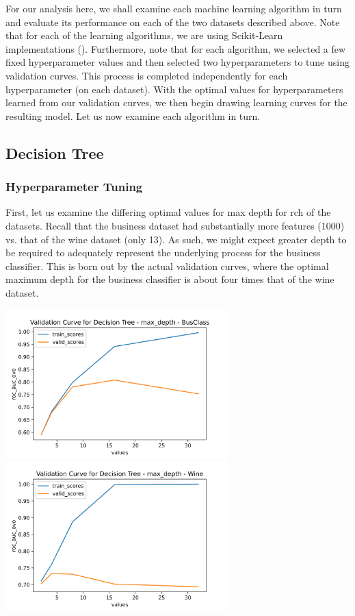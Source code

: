 \documentclass[
	letterpaper, %
]{jdf}
\begin{document}
For our analysis here, we shall examine each machine learning algorithm in turn and evaluate its performance on each of the two datasets described above. Note that for each of the learning algorithms, we are using Scikit-Learn implementations (\cite{sklearn_api}). Furthermore, note that for each algorithm, we selected a few fixed hyperparameter values and then selected two hyperparameters to tune using validation curves. This process is completed independently for each hyperparameter (on each dataset). With the optimal values for hyperparameters learned from our validation curves, we then begin drawing learning curves for the resulting model. Let us now examine each algorithm in turn.

\subsection{Decision Tree}

\subsubsection{Hyperparameter Tuning}
First, let us examine the differing optimal values for max depth for rch of the datasets. Recall that the business dataset had substantially more features (1000) vs. that of the wine dataset (only 13). As such, we might expect greater depth to be required to adequately represent the underlying process for the business classifier. This is born out by the actual validation curves, where the optimal maximum depth for the business classifier is about four times that of the wine dataset.

\includegraphics[width=3.4in]{Figures/BusClass-0920/DT/val_curve_0.png}
\includegraphics[width=3.4in]{Figures/Wine-0921/DT/val_curve_0.png}
\end{document}
